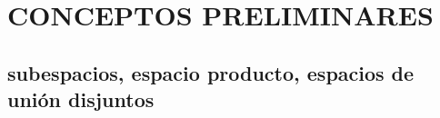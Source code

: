 \chapter{CONCEPTOS PRELIMINARES}

\section{subespacios, espacio producto, espacios de unión disjuntos}

